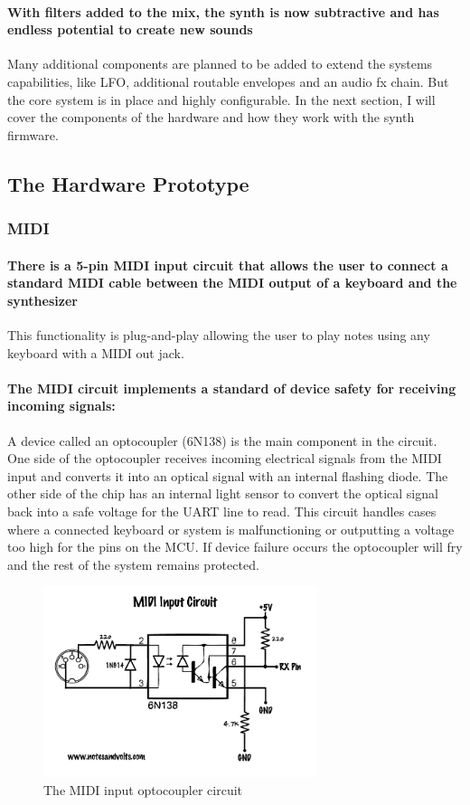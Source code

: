 \documentclass[acmlarge,screen]{acmart}
\begin{document}
	\paragraph{With filters added to the mix, the synth is now subtractive and has endless potential to create new sounds} Many additional components are planned to be added to extend the systems capabilities, like LFO, additional routable envelopes and an audio fx chain. But the core system is in place and highly configurable. In the next section, I will cover the components of the hardware and how they work with the synth firmware.

\subsection{The Hardware Prototype}
	\subsubsection{MIDI}
	\paragraph{There is a 5-pin MIDI input circuit that allows the user to connect a standard MIDI cable between the MIDI output of a keyboard and the synthesizer} This functionality is plug-and-play allowing the user to play notes using any keyboard with a MIDI out jack.

	\paragraph{The MIDI circuit implements a standard of device safety for receiving incoming signals:} A device called an optocoupler (6N138) is the main component in the circuit. One side of the optocoupler receives incoming electrical signals from the MIDI input and converts it into an optical signal with an internal flashing diode. The other side of the chip has an internal light sensor to convert the optical signal back into a safe voltage for the UART line to read. This circuit handles cases where a connected keyboard or system is malfunctioning or outputting a voltage too high for the pins on the MCU. If device failure occurs the optocoupler will fry and the rest of the system remains protected. \cite{notesandvolts}
	\begin{figure}
		\includegraphics[width=8cm]{midi_optocoupler_circuit}
		\caption{The MIDI input optocoupler circuit}
		\centering
	\end{figure}
	
\end{document}
